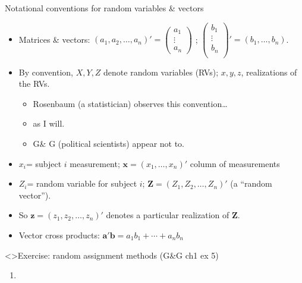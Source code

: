 \begin{frame}{Notational conventions for random variables \& vectors}
  
  \begin{itemize}
\item Matrices \& vectors: $(a_{1}, a_{2}, \ldots, a_{n})' = \left(
    \begin{array}{c}
      a_{1} \\ \vdots \\ a_{n}
    \end{array}
\right)$ ;  $\left(
      \begin{array}{c}
        b_{1} \\  \vdots \\ b_{n}\\
      \end{array}
\right)' = (b_{1}, \ldots, b_{n})$.
  \item By convention, $X, Y, Z$ denote random variables (RVs); $x, y, z$, realizations of the RVs.
    \begin{itemize}
    \item Rosenbaum (a statistician) observes this convention\ldots
    \item as I will.
    \item G\& G (political scientists) appear not to.
    \end{itemize}
 \item $x_{i}$= subject $i$ measurement; $\mathbf{x} =(x_{1}, \ldots, x_{n})'$ column of measurements
  \item $Z_i$= random variable for subject $i$; $\mathbf{Z}=(Z_1, Z_2,
    \ldots, Z_n)'$ (a ``random vector'').  
  \item So $\mathbf{z}=(z_1, z_2, \ldots, z_n)'$ denotes a particular
    realization of $\mathbf{Z} $.
  \item Vector cross products: $\mathbf{a}'\mathbf{b}  = a_{1}b_{1} + \cdots + a_{n}b_{n}$
  \end{itemize}


\end{frame}

\begin{frame}<\nottheirhandout>{Exercise: random assignment methods}
{\footnotesize (G\&G ch1 ex 5)}

\begin{enumerate} \addtocounter{enumi}{9}
\item 
{\small 
}
\end{enumerate}
\vfill

\end{frame}


